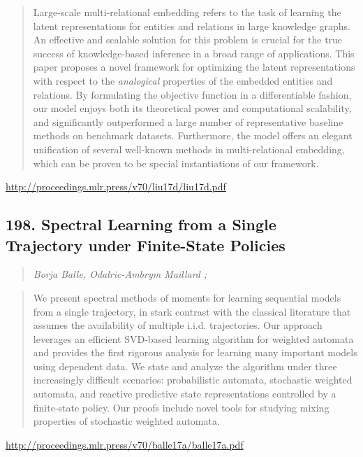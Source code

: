 \documentclass{article}
\begin{document}
\begin{quote}
    Large-scale multi-relational embedding refers to the task of learning the latent representations for entities and relations in large knowledge graphs. An effective and scalable solution for this problem is crucial for the true success of knowledge-based inference in a broad range of applications. This paper proposes a novel framework for optimizing the latent representations with respect to the \textit{analogical} properties of the embedded entities and relations. By formulating the objective function in a differentiable fashion, our model enjoys both its theoretical power and computational scalability, and significantly outperformed a large number of representative baseline methods on benchmark datasets. Furthermore, the model offers an elegant unification of several well-known methods in multi-relational embedding, which can be proven to be special instantiations of our framework.  
\end{quote}

\href{http://proceedings.mlr.press/v70/liu17d/liu17d.pdf}{http://proceedings.mlr.press/v70/liu17d/liu17d.pdf}

\subsection{198. Spectral Learning from a Single Trajectory under Finite-State Policies}

\begin{quote}
\footnotesize{\textit{Borja Balle, Odalric-Ambrym Maillard ;}}

\end{quote}

\begin{quote}
    We present spectral methods of moments for learning sequential models from a single trajectory, in stark contrast with the classical literature that assumes the availability of multiple i.i.d. trajectories. Our approach leverages an efficient SVD-based learning algorithm for weighted automata and provides the first rigorous analysis for learning many important models using dependent data. We state and analyze the algorithm under three increasingly difficult scenarios: probabilistic automata, stochastic weighted automata, and reactive predictive state representations controlled by a finite-state policy. Our proofs include novel tools for studying mixing properties of stochastic weighted automata.  
\end{quote}

\href{http://proceedings.mlr.press/v70/balle17a/balle17a.pdf}{http://proceedings.mlr.press/v70/balle17a/balle17a.pdf}
\end{document}
